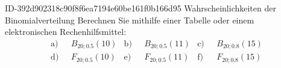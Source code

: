 \begin{exercise}
      {ID-392d902318c90f8f6ea7194e60be161f0b166d95}
      {Wahrscheinlichkeiten der Binomialverteilung}
  \ifproblem\problem
    Berechnen Sie mithilfe einer Tabelle oder einem elektronischen
    Rechenhilfsmittel:
    \begin{align*}
        \text{a)~~}&B_{20;\num{0.5}}(10)
      & \text{b)~~}&B_{20;\num{0.5}}(11)
      & \text{c)~~}&B_{20;\num{0.8}}(15) \\
        \text{d)~~}&F_{20;\num{0.5}}(10)
      & \text{e)~~}&F_{20;\num{0.5}}(11)
      & \text{f)~~}&F_{20;\num{0.8}}(15)
    \end{align*}
  \fi
\end{exercise}
